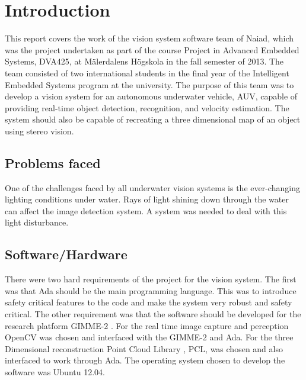 \section{Introduction}\label{sec:introduction}
This report covers the work of the vision system software team of Naiad, which was the project undertaken as part of the course Project in Advanced Embedded Systems, DVA425, at M\"{a}lerdalens H\"{o}gskola in the fall semester of 2013. The team consisted of two international students in the final year of the Intelligent Embedded Systems program at the university.
The purpose of this team was to develop a vision system for an autonomous underwater vehicle, AUV, capable of providing real-time object detection, recognition, and velocity estimation. The system should also be capable of recreating a three dimensional map of an object using stereo vision.

\subsection{Problems faced}
One of the challenges faced by all underwater vision systems is the ever-changing lighting conditions under water. Rays of light shining down through the water can affect the image detection system. A system was needed to deal with this light disturbance.

\subsection{Software/Hardware}
There were two hard requirements of the project for the vision system. The first was that Ada should be the main programming language. This was to introduce safety critical features to the code and make the system very robust and safety critical. The other requirement was that the software should be developed for the research platform GIMME-2 \cite{web:GIMME2}. 
For the real time image capture and perception OpenCV \cite{web:OpenCV} was chosen and interfaced with the GIMME-2 and Ada. For the three Dimensional reconstruction Point Cloud Library \cite{web:PCL}, PCL, was chosen and also interfaced to work through Ada. The operating system chosen to develop the software was Ubuntu 12.04.

